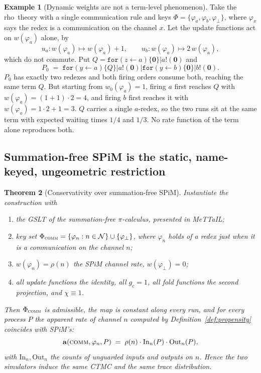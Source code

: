 \documentclass[11pt,a4paper]{article}
\theoremstyle{plain}
\newtheorem{theorem}{Theorem}
\theoremstyle{definition}
\newtheorem{example}[theorem]{Example}
\theoremstyle{remark}
\newcommand{\rhoc}{\textsf{rho}}
\newcommand{\Nil}{\mathbf{0}}
\newcommand{\sepc}{\mathbin{\big|}}
\newcommand{\prop}{\mathbf{a}}
\newcommand{\wmap}{w}
\newcommand{\gfac}{g}
\begin{document}
\begin{example}[Dynamic weights are not a term-level phenomenon]
\label{ex:nonmarkov}
Take the \rhoc\ theory with a single communication rule and keys
$\Phi = \{\varphi_a, \varphi_b, \varphi_\bot\}$, where $\varphi_x$ says the redex is a communication
on the channel $x$. Let the update functions act on $\wmap(\varphi_a)$ alone, by
\[
u_a : \wmap(\varphi_a) \mapsto \wmap(\varphi_a) + 1,
\qquad
u_b : \wmap(\varphi_a) \mapsto 2\,\wmap(\varphi_a),
\]
which do not commute. Put $Q = \texttt{for}(z \leftarrow a)\{\Nil\} \sepc a!(\Nil)$ and
\[
P_0 \;=\; \texttt{for}(y \leftarrow a)\{Q\} \sepc a!(\Nil) \sepc \texttt{for}(y\leftarrow b)\{\Nil\} \sepc b!(\Nil).
\]
$P_0$ has exactly two redexes and both firing orders consume both, reaching the same term $Q$. But
starting from $\wmap_0(\varphi_a) = 1$, firing $a$ first reaches $Q$ with
$\wmap(\varphi_a) = (1+1)\cdot 2 = 4$, and firing $b$ first reaches it with
$\wmap(\varphi_a) = 1\cdot 2 + 1 = 3$. $Q$ carries a single $a$-redex, so the two runs sit at the
same term with expected waiting times $1/4$ and $1/3$. No rate function of the term alone reproduces
both.
\end{example}

\subsection{Summation-free SPiM is the static, name-keyed, ungeometric restriction}
\label{sec:spim}

\begin{theorem}[Conservativity over summation-free SPiM]
\label{thm:spim}
Instantiate the construction with
\begin{enumerate}[label=(\alph*),leftmargin=2.2em]
\item the GSLT of the \emph{summation-free} $\pi$-calculus, presented in MeTTaIL;
\item key set $\Phi_{\textsc{comm}} = \{\varphi_n : n \in \mathcal{N}\} \cup \{\varphi_\bot\}$, where
$\varphi_n$ holds of a redex just when it is a communication on the channel $n$;
\item $\wmap(\varphi_n) = \rho(n)$ the SPiM channel rate, $\wmap(\varphi_\bot) = 0$;
\item all update functions the identity, all $\gfac_c = 1$, all fold functions the second projection,
and $\chi \equiv 1$.
\end{enumerate}
Then $\Phi_{\textsc{comm}}$ is admissible, the map is constant along every run, and for every process
$P$ the apparent rate of channel $n$ computed by Definition~\ref{def:propensity} coincides with
SPiM's:
\[
\prop(\textsc{comm}, \varphi_n, P) \;=\; \rho(n)\cdot \mathrm{In}_n(P)\cdot \mathrm{Out}_n(P),
\]
with $\mathrm{In}_n, \mathrm{Out}_n$ the counts of unguarded inputs and outputs on $n$. Hence the
two simulators induce the same CTMC and the same trace distribution.
\end{theorem}
\end{document}

